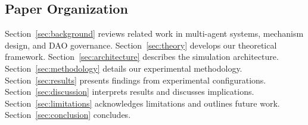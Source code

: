 \subsection{Paper Organization}

Section~\ref{sec:background} reviews related work in multi-agent systems, mechanism design, and DAO governance. Section~\ref{sec:theory} develops our theoretical framework. Section~\ref{sec:architecture} describes the simulation architecture. Section~\ref{sec:methodology} details our experimental methodology. Section~\ref{sec:results} presents findings from \experimentcount{} experimental configurations. Section~\ref{sec:discussion} interprets results and discusses implications. Section~\ref{sec:limitations} acknowledges limitations and outlines future work. Section~\ref{sec:conclusion} concludes.
